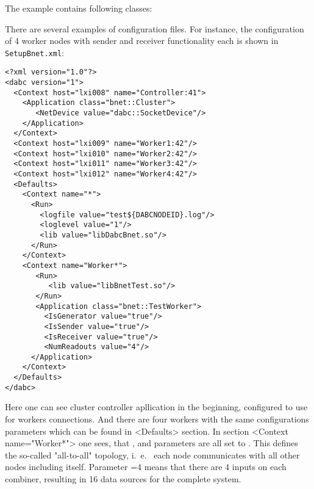 The example contains following classes:
\bbul
\item  {}
\item  {}
\item  {}
\item  {}
\item  {}
\item  {}
\ebul

There are several examples of configuration files. For instance,
the configuration of 4 worker nodes with sender and receiver functionality each
is shown in {\tt SetupBnet.xml}:

\begin{small}
\begin{verbatim}
<?xml version="1.0"?>
<dabc version="1">
  <Context host="lxi008" name="Controller:41">
    <Application class="bnet::Cluster">
       <NetDevice value="dabc::SocketDevice"/>
    </Application>
  </Context>
  <Context host="lxi009" name="Worker1:42"/>
  <Context host="lxi010" name="Worker2:42"/>
  <Context host="lxi011" name="Worker3:42"/>
  <Context host="lxi012" name="Worker4:42"/>
  <Defaults>
    <Context name="*">
      <Run>
        <logfile value="test${DABCNODEID}.log"/>
        <loglevel value="1"/>
        <lib value="libDabcBnet.so"/>
      </Run>
    </Context>
    <Context name="Worker*">
       <Run>
          <lib value="libBnetTest.so"/>
       </Run>
       <Application class="bnet::TestWorker">
         <IsGenerator value="true"/>
         <IsSender value="true"/>
         <IsReceiver value="true"/>
         <NumReadouts value="4"/>
      </Application>       
    </Context>
  </Defaults>
</dabc>
\end{verbatim}
\end{small}

Here one can see cluster controller apllication in the beginning, configured to
use  for workers connections. And there are four workers
with the same configurations parameters which can be found in <Defaults> section.
In section <Context name="Worker*"> one sees, 
that ,  and  parameters are 
all set to .
This defines the so-called "all-to-all" topology, i.~e.~ each node communicates with all other nodes including itself.   
Parameter =4 means that there are 4 inputs on each combiner, 
resulting  in 16 data sources for the complete system.

